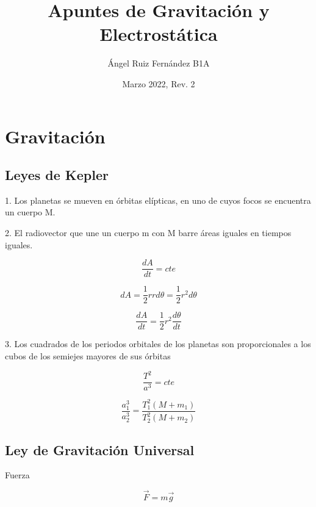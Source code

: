 \documentclass[12pt, letterpaper, twoside]{article}
\title{Apuntes de Gravitación y Electrostática}
\author{Ángel Ruiz Fernández B1A}
\date{Marzo 2022, Rev. 2}
\begin{document}
	\maketitle
	
	\section{Gravitación}
	
		\subsection{Leyes de Kepler}
		
		
			1. Los planetas se mueven en órbitas elípticas, en uno de cuyos focos se encuentra un cuerpo M.
			
			2. El radiovector que une un cuerpo m con M barre áreas iguales en tiempos iguales.
			
			\begin{equation}
				\frac{dA}{dt} = cte
			\end{equation}
			
			\begin{equation}
				dA = \frac{1}{2} r r d \theta =  \frac{1}{2} r^2 d \theta
			\end{equation}
			
			\begin{equation}
				\frac{dA}{dt} = \frac{1}{2} r^2 \frac{d\theta}{dt}
			\end{equation}
			
			3. Los cuadrados de los periodos orbitales de los planetas son proporcionales a los cubos de los
			semiejes mayores de sus órbitas
			
			\begin{equation}
				\frac{T^2}{a^3} = cte
			\end{equation}
			
			\begin{equation}
				\frac{a^3_1}{a^3_2} = \frac{T^2_1(M+m_1)}{T^2_2(M+m_2)}
			\end{equation}
	
		\subsection{Ley de Gravitación Universal}
		
			Fuerza
			
			\begin{equation}
				\vec{F} = m \vec{g}
			\end{equation}
			
\end{document}
